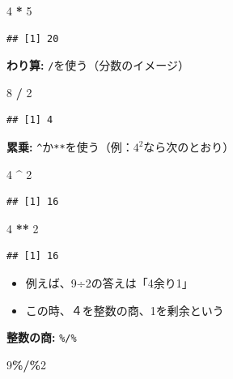 \documentclass[
]{book}
\newenvironment{Shaded}{\begin{snugshade}}{\end{snugshade}}
\newcommand{\DecValTok}[1]{\textcolor[rgb]{0.00,0.00,0.81}{#1}}
\newcommand{\SpecialCharTok}[1]{\textcolor[rgb]{0.81,0.36,0.00}{\textbf{#1}}}
\providecommand{\tightlist}{%
  \setlength{\itemsep}{0pt}\setlength{\parskip}{0pt}}
\begin{document}
\begin{Shaded}
\begin{Highlighting}[]
\DecValTok{4} \SpecialCharTok{*} \DecValTok{5}
\end{Highlighting}
\end{Shaded}

\begin{verbatim}
## [1] 20
\end{verbatim}

\textbf{わり算:} \texttt{/}を使う（分数のイメージ）

\begin{Shaded}
\begin{Highlighting}[]
\DecValTok{8} \SpecialCharTok{/} \DecValTok{2}
\end{Highlighting}
\end{Shaded}

\begin{verbatim}
## [1] 4
\end{verbatim}

\textbf{累乗:} \texttt{\^{}}か\texttt{**}を使う（例：\(4^2\)なら次のとおり）

\begin{Shaded}
\begin{Highlighting}[]
\DecValTok{4} \SpecialCharTok{\^{}} \DecValTok{2}
\end{Highlighting}
\end{Shaded}

\begin{verbatim}
## [1] 16
\end{verbatim}

\begin{Shaded}
\begin{Highlighting}[]
\DecValTok{4} \SpecialCharTok{**} \DecValTok{2}
\end{Highlighting}
\end{Shaded}

\begin{verbatim}
## [1] 16
\end{verbatim}

\begin{itemize}
\tightlist
\item
  例えば、9÷2の答えは「4余り1」
\item
  この時、４を整数の商、1を剰余という
\end{itemize}

\textbf{整数の商:} \texttt{\%/\%}

\begin{Shaded}
\begin{Highlighting}[]
\DecValTok{9}\SpecialCharTok{\%/\%}\DecValTok{2}
\end{Highlighting}
\end{Shaded}
\end{document}
